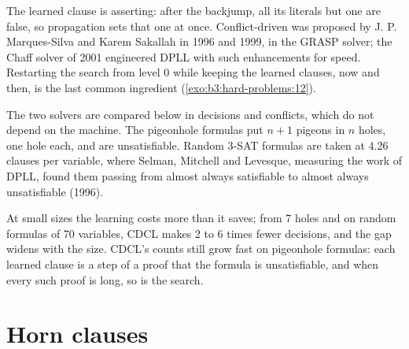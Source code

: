 \label{lst:b3:hard-problems:analyse}

\label{lst:b3:hard-problems:solve}

The learned clause is asserting: after the backjump, all its literals but one are false, so propagation sets that one at once. Conflict-driven  was proposed by J. P. Marques-Silva and Karem Sakallah in 1996 and 1999, in the GRASP solver; the Chaff solver of 2001 engineered DPLL with such enhancements for speed. %
Restarting the search from level 0 while keeping the learned clauses, now and then, is the last common ingredient (\cref{exo:b3:hard-problems:12}).

The two solvers are compared below in decisions and conflicts, which do not depend on the machine. The pigeonhole formulas put $n + 1$ pigeons in $n$ holes, one hole each, and are unsatisfiable. Random 3-SAT formulas are taken at 4.26 clauses per variable, where Selman, Mitchell and Levesque, measuring the work of DPLL, found them passing from almost always satisfiable to almost always unsatisfiable (1996). %

\label{lst:b3:hard-problems:pigeonhole}

\label{out:b3:hard-problems:sat}

At small sizes the learning costs more than it saves; from 7 holes and on random formulas of 70 variables, CDCL makes 2 to 6 times fewer decisions, and the gap widens with the size. CDCL's counts still grow fast on pigeonhole formulas: each learned clause is a step of a proof that the formula is unsatisfiable, and when every such proof is long, so is the search.

\section{Horn clauses}\label{sec:b3:hard-problems:horn}

